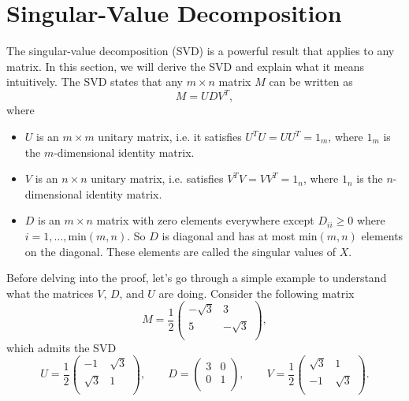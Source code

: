 \documentclass{article}
\theoremstyle{definition}
\begin{document}
\section{Singular-Value Decomposition}
The singular-value decomposition (SVD) is a powerful result that applies to any matrix. In this section, we will derive the SVD and explain what it means intuitively. The SVD states that any $m\times n$ matrix $M$ can be written as
\begin{equation}
    M=UDV^T,
\end{equation}
where
\begin{itemize}
    \item $U$ is an $m\times m$ unitary matrix, i.e. it satisfies $U^TU=UU^T=1_m$, where $1_m$ is the $m$-dimensional identity matrix.
    \item $V$ is an $n\times n$ unitary matrix, i.e. satisfies $V^TV=VV^T=1_n$, where $1_n$ is the $n$-dimensional identity matrix.
    \item $D$ is an $m\times n$ matrix with zero elements everywhere except $D_{ii}\ge0$ where $i=1,\dots,\text{min}(m, n)$. So $D$ is diagonal and has at most $\text{min}(m, n)$ elements on the diagonal. These elements are called the singular values of $X$.
\end{itemize}
Before delving into the proof, let's go through a simple example to understand what the matrices $V$, $D$, and $U$ are doing. Consider the following matrix
\begin{equation}
    M = \frac{1}{2}
    \begin{pmatrix}
        -\sqrt{3} & 3 \\
        5 & -\sqrt{3} \\
    \end{pmatrix},
\end{equation}
which admits the SVD
\begin{equation}
    U = \frac{1}{2}
    \begin{pmatrix}
        -1 & \sqrt{3} \\
        \sqrt{3} & 1 \\
    \end{pmatrix}, \qquad
    D =
    \begin{pmatrix}
        3 & 0 \\
        0 & 1 \\
    \end{pmatrix}, \qquad
    V = \frac{1}{2}
    \begin{pmatrix}
        \sqrt{3} & 1 \\
        -1 & \sqrt{3} \\
    \end{pmatrix}.
\end{equation}
\end{document}
